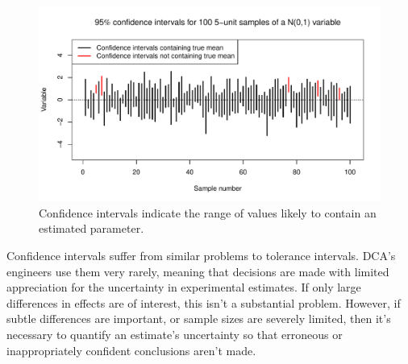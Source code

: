 \documentclass[11pt,a4paper,article]{memoir} %
\begin{document}
\begin{figure}[H]
\includegraphics[width=\textwidth]{confidence_intervals.pdf}
\caption{Confidence intervals indicate the range of values likely to contain an estimated parameter.}
\label{fig:confidence_intervals}
\end{figure}
Confidence intervals suffer from similar problems to tolerance intervals. DCA's engineers use them very rarely, meaning that decisions are made with limited appreciation for the uncertainty in experimental estimates. If only large differences in effects are of interest, this isn't a substantial problem. However, if subtle differences are important, or sample sizes are severely limited, then it's necessary to quantify an estimate's uncertainty so that erroneous or inappropriately confident conclusions aren't made.
\end{document}
